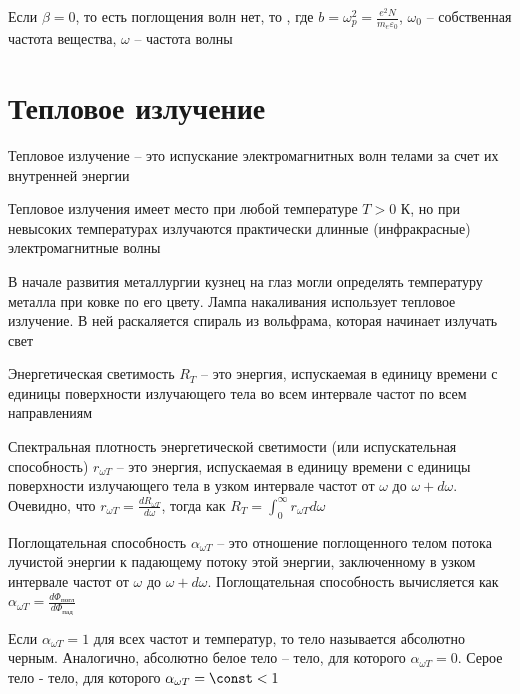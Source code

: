 Если $\beta = 0$, то есть поглощения волн нет, то , где $b = \omega_p^2 = \frac{e^2 N}{m_e \varepsilon_0}$, $\omega_0$ -- собственная частота вещества, $\omega$ -- частота волны


\section{Тепловое излучение}

Тепловое излучение -- это испускание электромагнитных волн телами за счет их внутренней энергии

Тепловое излучения имеет место при любой температуре $T > 0$ К, но при невысоких температурах излучаются практически длинные (инфракрасные) электромагнитные волны

В начале развития металлургии кузнец на глаз могли определять температуру металла при ковке по его цвету. Лампа накаливания использует тепловое излучение. В ней раскаляется спираль из вольфрама, которая начинает излучать свет

Энергетическая светимость $R_{T}$ -- это энергия, испускаемая в единицу времени с единицы поверхности излучающего тела во всем интервале частот по всем направлениям

Спектральная плотность энергетической светимости (или испускательная способность) $r_{\omega T}$ -- это энергия, испускаемая в единицу времени с единицы поверхности излучающего тела в узком интервале частот от $\omega$ до $\omega + d \omega$. Очевидно, что $r_{\omega T} = \frac{d R_{\omega T}}{d \omega}$, тогда как $R_T = \int_0^\infty r_{\omega T} d\omega$

Поглощательная способность $\alpha_{\omega T}$ -- это отношение поглощенного телом потока лучистой энергии к падающему потоку этой энергии, заключенному в узком интервале частот от $\omega$ до $\omega + d\omega$. Поглощательная способность вычисляется как $\alpha_{\omega T} = \frac{d \Phi_{\text{погл}}}{d \Phi_{\text{пад}}}$

Если $\alpha_{\omega T} = 1$ для всех частот и температур, то тело называется абсолютно черным. Аналогично, абсолютно белое тело -- тело, для которого $\alpha_{\omega T} = 0$. Серое тело - тело, для которого $\alpha_{\omega T} = \const < 1$

\mediumvspace


